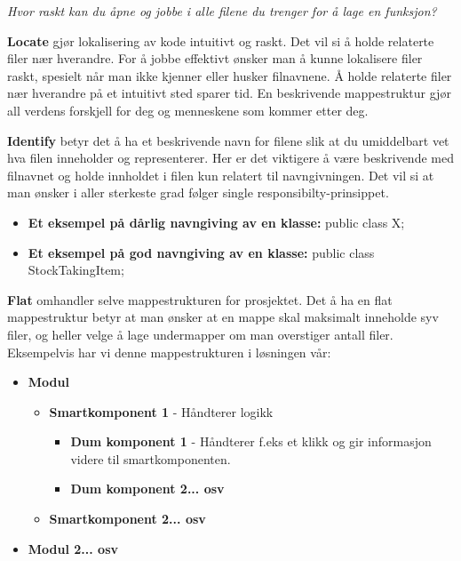 \textit{Hvor raskt kan du åpne og jobbe i alle filene du trenger for å lage en funksjon? }

\textbf{Locate} gjør lokalisering av kode intuitivt og raskt. Det vil si å holde relaterte filer nær hverandre. For å jobbe effektivt ønsker man å kunne lokalisere filer raskt, spesielt når man ikke kjenner eller husker filnavnene. Å holde relaterte filer nær hverandre på et intuitivt sted sparer tid. En beskrivende mappestruktur gjør all verdens forskjell for deg og menneskene som kommer etter deg.

\textbf{Identify} betyr det å ha et beskrivende navn for filene slik at du umiddelbart vet hva filen inneholder og representerer. Her er det viktigere å være beskrivende med filnavnet og holde innholdet i filen kun relatert til navngivningen. Det vil si at man ønsker i aller sterkeste grad følger single responsibilty-prinsippet.

\begin{itemize}
    \item \textbf{Et eksempel på dårlig navngiving av en klasse:} public class X;
    \item \textbf{Et eksempel på god navngiving av en klasse:} public class StockTakingItem;
\end{itemize}


\textbf{Flat} omhandler selve mappestrukturen for prosjektet. Det å ha en flat mappestruktur betyr at man ønsker at en mappe skal maksimalt inneholde syv filer, og heller velge å lage undermapper om man overstiger antall filer. 
Eksempelvis har vi denne mappestrukturen i løsningen vår:

\begin{itemize}
    \item \textbf{Modul}
    \begin{itemize}
        \item \textbf{Smartkomponent 1} - Håndterer logikk
        \begin{itemize}
            \item \textbf{Dum komponent 1} - Håndterer f.eks et klikk og gir informasjon videre til smartkomponenten.
            \item \textbf{Dum komponent 2... osv}
        \end{itemize}
        \item \textbf{Smartkomponent 2... osv}
    \end{itemize}
    \item \textbf{Modul 2... osv}
\end{itemize}


